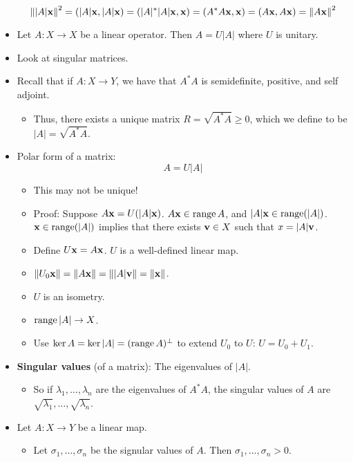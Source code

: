 \documentclass[../../notes.tex]{subfiles}
\begin{document}
\begin{itemize}
\begin{equation*}
        \norm{|A|\mathbf{x}}^2
        = (|A|\mathbf{x},|A|\mathbf{x})
        = (|A|^*|A|\mathbf{x},\mathbf{x})
        = (A^*A\mathbf{x},\mathbf{x})
        = (A\mathbf{x},A\mathbf{x})
        = \norm{A\mathbf{x}}^2
    \end{equation*}
    \item Let $A:X\to X$ be a linear operator. Then $A=U|A|$ where $U$ is unitary.
    \item Look at singular matrices.
    \item {}Recall that if $A:X\to Y$, we have that $A^*A$ is semidefinite, positive, and self adjoint.
    \begin{itemize}
        \item Thus, there exists a unique matrix $R=\sqrt{A^*A}\geq 0$, which we define to be $|A|=\sqrt{A^*A}$.
    \end{itemize}
    \item Polar form of a matrix:
    \begin{equation*}
        A = U|A|
    \end{equation*}
    \begin{itemize}
        \item This may not be unique!
        \item Proof: Suppose $A\mathbf{x}=U(|A|\mathbf{x})$. $A\mathbf{x}\in\operatorname{range} A$, and $|A|\mathbf{x}\in\operatorname{range}(|A|)$. $\mathbf{x}\in\operatorname{range}(|A|)$ implies that there exists $\mathbf{v}\in X$ such that $x=|A|\mathbf{v}$.
        \item Define $U\mathbf{x}=A\mathbf{x}$. $U$ is a well-defined linear map.
        \item $\norm{U_0\mathbf{x}}=\norm{A\mathbf{x}}=\norm{|A|\mathbf{v}}=\norm{\mathbf{x}}$.
        \item $U$ is an isometry.
        \item $\operatorname{range}|A|\to X$.
        \item Use $\ker A=\ker|A|=(\operatorname{range} A)^\perp$ to extend $U_0$ to $U$: $U=U_0+U_1$.
    \end{itemize}
    \item \textbf{Singular values} (of a matrix): The eigenvalues of $|A|$.
    \begin{itemize}
        \item So if $\lambda_1,\dots,\lambda_n$ are the eigenvalues of $A^*A$, the singular values of $A$ are $\sqrt{\lambda_1},\dots,\sqrt{\lambda_n}$.
    \end{itemize}
    \item Let $A:X\to Y$ be a linear map.
    \begin{itemize}
        \item Let $\sigma_1,\dots,\sigma_n$ be the signular values of $A$. Then $\sigma_1,\dots,\sigma_n>0$.

\end{itemize}
\end{itemize}
\end{document}
